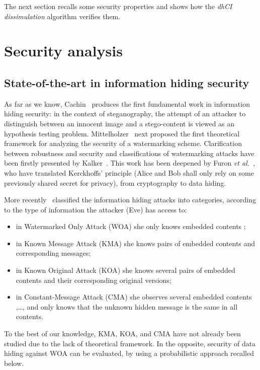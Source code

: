 \documentclass{comjnl}
\begin{document}
The next section recalls some security properties and shows how the 
\emph{dhCI dissimulation} algorithm verifies them.

\section{Security analysis}\label{sec:security}
\subsection{State-of-the-art in information hiding security}\label{sub:art}



As far as we know, Cachin~\cite{Cachin2004}
produces the first fundamental work in information hiding security:
in the context of steganography, the attempt of an attacker to distinguish 
between an innocent image and a stego-content is viewed as an hypothesis 
testing problem.
Mittelholzer~\cite{Mittelholzer99} next proposed the first theoretical 
framework for analyzing the security of a watermarking scheme.
Clarification between  robustness and security 
and classifications of watermarking attacks
have been firstly presented by Kalker~\cite{Kalker2001}.
This work has been deepened by Furon \emph{et al.}~\cite{Furon2002}, who have translated Kerckhoffs' principle (Alice and Bob shall only rely on some previously shared secret for privacy), from cryptography to data hiding. 

More recently~\cite{Cayre2005,Perez06} classified the information hiding  
attacks into categories, according to the type of information the attacker (Eve)
has access to:
\begin{itemize}
\item in Watermarked Only Attack (WOA) she only knows embedded contents ;
\item in Known Message Attack (KMA) she knows pairs  of embedded
  contents and corresponding messages;
\item in Known Original Attack (KOA) she knows several pairs  
  of embedded contents and their corresponding original versions;
\item in Constant-Message Attack (CMA) she observes several embedded
  contents ,\ldots, and only knows that the unknown 
  hidden message  is the same in all contents.
\end{itemize}

To the best of our knowledge, 
KMA, KOA, and CMA have not already been studied
due to the lack of theoretical framework.
In the opposite, security of data hiding against WOA can be evaluated,
by using a probabilistic approach recalled below.
\end{document}
